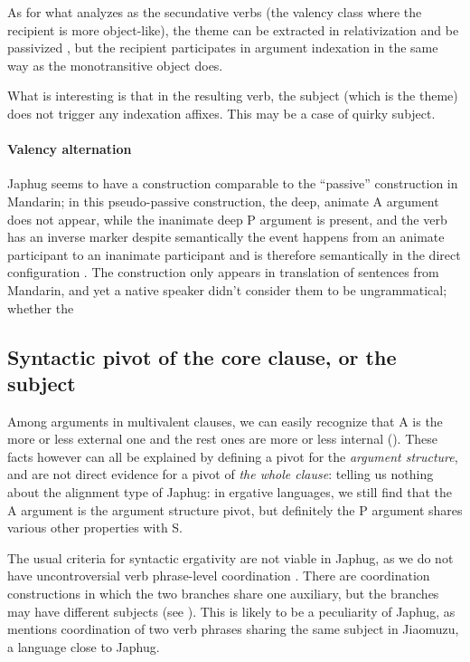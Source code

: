 \documentclass[a4paper, oneside, 12pt]{report}
\newcommand*{\citesec}[1]{\S~{#1}}
\newcommand*{\citepage}[1]{p.~{#1}}
\newcommand*{\citepages}[1]{pp.~{#1}}
\begin{document}
As for what \citet[\citesec{14.4.2}]{jacques2021grammar} analyzes as 
the secundative verbs (the valency class where the recipient is more object-like),
the theme can be extracted in relativization \citep[\citepages{581}]{jacques2021grammar}
and be passivized \citep[\citesec{18.1.4}]{jacques2021grammar},
but the recipient participates in argument indexation
in the same way as the monotransitive object does.

What is interesting is that in the resulting verb,
the subject (which is the theme) does not trigger any indexation affixes.
This may be a case of quirky subject.

\paragraph*{Valency alternation} 
Japhug seems to have a construction comparable to
the ``passive'' construction in Mandarin;
in this pseudo-passive construction,
the deep, animate A argument does not appear, 
while the inanimate deep P argument is present, 
and the verb has an inverse marker 
despite semantically the event happens 
from an animate participant to an inanimate participant
and is therefore semantically in the direct configuration
\citep[\citepage{575}]{jacques2021grammar}.
The construction only appears in translation of sentences from Mandarin,
and yet a native speaker didn't consider them to be ungrammatical;
whether the 


\subsection{Syntactic pivot of the core clause, or the subject}\label{sec:grammatical.clause.subject}

Among arguments in multivalent clauses, we can easily recognize that 
A is the more or less external one
and the rest ones are more or less internal
().
These facts however can all be explained by defining a pivot for the \emph{argument structure},
and are not direct evidence for a pivot of \emph{the whole clause}:
telling us nothing about the alignment type of Japhug:
in ergative languages, we still find that the A argument is the argument structure pivot,
but definitely the P argument shares various other properties with S.

The usual criteria for syntactic ergativity are not viable in Japhug,
as we do not have uncontroversial verb phrase-level coordination \citep{jacques2014clause}.
There are coordination constructions in which the two branches share one auxiliary,
but the branches may have different subjects
(see ).
This is likely to be a peculiarity of Japhug,
as \citet[\citepage{549}]{prins2011web} mentions 
coordination of two verb phrases sharing the same subject
in Jiaomuzu, a language close to Japhug.
\end{document}
